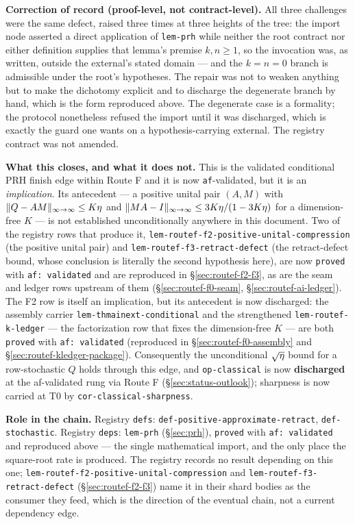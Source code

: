 \noindent\textbf{Correction of record (proof-level, not contract-level).} All three
challenges were the same defect, raised three times at three heights of the tree: the
import node asserted a direct application of \texttt{lem-prh} while neither the root
contract nor either definition supplies that lemma's premise $k,n\ge1$, so the invocation
was, as written, outside the external's stated domain --- and the $k=n=0$ branch is
admissible under the root's hypotheses. The repair was not to weaken anything but to make
the dichotomy explicit and to discharge the degenerate branch by hand, which is the form
reproduced above. The degenerate case is a formality; the protocol nonetheless refused the
import until it was discharged, which is exactly the guard one wants on a
hypothesis-carrying external. The registry contract was not amended.

\noindent\textbf{What this closes, and what it does not.} This is the validated conditional PRH finish edge within Route F
and it is now \texttt{af}-validated, but it is an \emph{implication}. Its antecedent --- a
positive unital pair $(A,M)$ with $\lVert Q-AM \rVert_{\infty\to\infty}\le K\eta$ and
$\lVert MA-I \rVert_{\infty\to\infty}\le3K\eta/(1-3K\eta)$ for a dimension-free $K$ --- is not established
unconditionally anywhere in this document. Two of the registry rows that produce it,
\texttt{lem-routef-f2-positive-unital-compression} (the positive unital pair) and
\texttt{lem-routef-f3-retract-defect} (the retract-defect bound, whose conclusion is
literally the second hypothesis here), are now \texttt{proved} with \texttt{af: validated}
and are reproduced in \S\ref{sec:routef-f2-f3}, as are the seam and ledger rows upstream of
them (\S\ref{sec:routef-f0-seam}, \S\ref{sec:routef-ai-ledger}). The F2 row is itself an
implication, but its antecedent is now discharged: the assembly carrier
\texttt{lem-thmainext-conditional} and the strengthened
\texttt{lem-routef-k-ledger} --- the factorization row that fixes the dimension-free
$K$ --- are both \texttt{proved} with \texttt{af: validated} (reproduced in
\S\ref{sec:routef-f0-assembly} and \S\ref{sec:routef-kledger-package}). Consequently the unconditional
$\sqrt{\eta}$ bound for a row-stochastic $Q$ holds through this edge, and
\texttt{op-classical} is now \textbf{discharged} at the af-validated rung via Route F
(\S\ref{sec:status-outlook}); sharpness is now carried at T0 by \texttt{cor-classical-sharpness}.

\noindent\textbf{Role in the chain.} Registry \texttt{defs}:
\texttt{def-positive-approximate-retract}, \texttt{def-stochastic}. Registry
\texttt{deps}: \texttt{lem-prh} (\S\ref{sec:prh}), \texttt{proved} with
\texttt{af: validated} and reproduced above --- the single mathematical import, and the
only place the square-root rate is produced. The registry records no result depending on
this one; \texttt{lem-routef-f2-positive-unital-compression} and
\texttt{lem-routef-f3-retract-defect} (\S\ref{sec:routef-f2-f3}) name it in their shard
bodies as the consumer they feed, which is the direction of the eventual chain, not a
current dependency edge.
